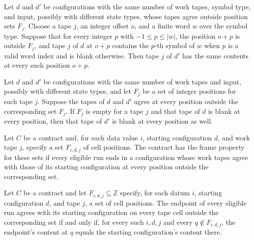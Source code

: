 \begin{theorem}
\label{Turing.Cfg.SameOutside.keep_word}
\leanok
{}
Let $d$ and $d'$ be configurations with the same number of work tapes, symbol type, and
input, possibly with different state types, whose tapes agree outside position sets
$F_j$. Choose a tape $j$, an integer offset $o$, and a finite word $w$ over the symbol
type. Suppose that for every integer $p$ with $-1\le p\le |w|$, the position $o+p$ is
outside $F_j$, and tape $j$ of $d$ at $o+p$ contains the $p$-th symbol of $w$ when $p$
is a valid word index and is blank otherwise. Then tape $j$ of $d'$ has the same
contents at every such position $o+p$.
\end{theorem}

\begin{theorem}
\label{Turing.Cfg.SameOutside.keep_blank}
\leanok
{}
Let $d$ and $d'$ be configurations with the same number of work tapes and input,
possibly with different state types, and let $F_j$ be a set of integer positions for
each tape $j$. Suppose the tapes of $d$ and $d'$ agree at every position outside the
corresponding set $F_j$. If $F_j$ is empty for a tape $j$ and that tape of $d$ is blank
at every position, then that tape of $d'$ is blank at every position as well.
\end{theorem}

\begin{definition}
\label{Turing.Contract.Frames}
\leanok
{}
Let $C$ be a contract and, for each data value $i$, starting configuration $d$, and work
tape $j$, specify a set $F_{i,d,j}$ of cell positions. The contract has the frame
property for these sets if every eligible run ends in a configuration whose work tapes
agree with those of its starting configuration at every position outside the
corresponding set.
\end{definition}

\begin{theorem}
\label{Turing.Contract.frames_iff}
\leanok
{}
Let $C$ be a contract and let $F_{i,d,j}\subseteq\mathbb Z$ specify, for each datum $i$,
starting configuration $d$, and tape $j$, a set of cell positions. The endpoint of every
eligible run agrees with its starting configuration on every tape cell outside the
corresponding set if and only if, for every such $i,d,j$ and every $q\notin F_{i,d,j}$,
the endpoint's content at $q$ equals the starting configuration's content there.
\end{theorem}

